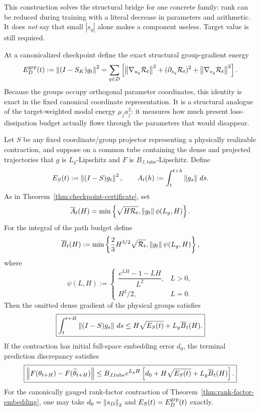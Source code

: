 This construction solves the structural bridge for one concrete family: rank can be reduced during training with a literal decrease in parameters and arithmetic. It does \emph{not} say that small $|s_q|$ alone makes a component useless. Target value is still required.

At a canonicalized checkpoint define the exact structural group-gradient energy
\[
E_D^{\rm grp}(t)
:=\left\lVert (I-S_K)g_t\right\rVert^2
=
\sum_{q\in D}
\left[
\left\lVert \nabla_{u_q}\mathcal R_t\right\rVert^2
+(\partial_{s_q}\mathcal R_t)^2
+\left\lVert \nabla_{v_q}\mathcal R_t\right\rVert^2
\right].
\]
Because the groups occupy orthogonal parameter coordinates, this identity is exact in the fixed canonical coordinate representation. It is a structural analogue of the target-weighted modal energy $\mu_ja_j^2$: it measures how much present loss-dissipation budget actually flows through the parameters that would disappear.

\begin{theorem}\label{thm:group-certificate}
Let $S$ be any fixed coordinate/group projector representing a physically realizable contraction, and suppose on a common tube containing the dense and projected trajectories that $g$ is $L_g$-Lipschitz and $F$ is $B_{J,\mathrm{tube}}$-Lipschitz. Define
\[
E_S(t):=\left\lVert (I-S)g_t\right\rVert^2,
\qquad
A_t(h):=\int_t^{t+h}\left\lVert g_s\right\rVert\,ds.
\]
As in Theorem~\ref{thm:checkpoint-certificate}, set
\[
\overline A_t(H)
=\min\left\{
\sqrt{H\mathcal R_t},
\left\lVert g_t\right\rVert\phi(L_g,H)
\right\}.
\]
For the integral of the path budget define
\[
\overline B_t(H)
:=
\min\left\{
\frac23H^{3/2}\sqrt{\mathcal R_t},
\left\lVert g_t\right\rVert\psi(L_g,H)
\right\},
\]
where
\[
\psi(L,H)
:=
\begin{cases}
\dfrac{e^{LH}-1-LH}{L^2},&L>0,\\[6pt]
H^2/2,&L=0.
\end{cases}
\]
Then the omitted dense gradient of the physical groups satisfies
\[
\boxed{
\int_t^{t+H}\left\lVert (I-S)g_s\right\rVert\,ds
\le
H\sqrt{E_S(t)}+L_g\overline B_t(H).}
\]
If the contraction has initial full-space embedding error $d_0$, the terminal prediction discrepancy satisfies
\[
\boxed{
\left\lVert F(\theta_{t+H})-F(\widetilde\theta_{t+H})\right\rVert
\le
B_{J,\mathrm{tube}}e^{L_gH}
\left[
d_0+H\sqrt{E_S(t)}+L_g\overline B_t(H)
\right].}
\]
For the canonically gauged rank-factor contraction of Theorem~\ref{thm:rank-factor-embedding}, one may take $d_0=\left\lVert s_D\right\rVert_2$ and $E_S(t)=E_D^{\rm grp}(t)$ exactly.
\end{theorem}

